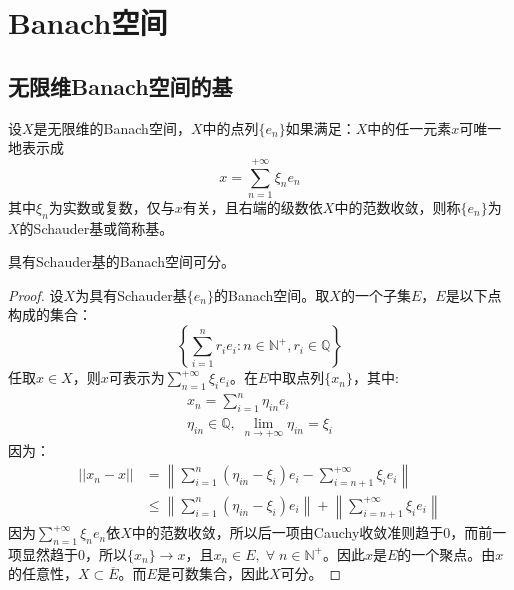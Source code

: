 \section{Banach空间}


\subsection{无限维Banach空间的基}
\begin{definition}
	设$X$是无限维的Banach空间，$X$中的点列$\{e_n\}$如果满足：$X$中的任一元素$x$可唯一地表示成
	\begin{equation*}
		x=\sum_{n=1}^{+\infty}\xi_ne_n
	\end{equation*}
	其中$\xi_n$为实数或复数，仅与$x$有关，且右端的级数依$X$中的范数收敛，则称$\{e_n\}$为$X$的Schauder基或简称基。
\end{definition}
\begin{theorem}
	具有Schauder基的Banach空间可分。
\end{theorem}
\begin{proof}
	设$X$为具有Schauder基$\{e_n\}$的Banach空间。取$X$的一个子集$E$，$E$是以下点构成的集合：
	\begin{equation*}
		\left\{\sum_{i=1}^nr_ie_i:n\in\mathbb{N}^+,r_i\in\mathbb{Q}\right\}
	\end{equation*}
	任取$x\in X$，则$x$可表示为$\sum\limits_{n=1}^{+\infty}\xi_ie_i$。在$E$中取点列$\{x_n\}$，其中:
	\begin{gather*}
		x_n=\sum_{i=1}^{n}\eta_{in}e_i \\
		\eta_{in}\in\mathbb{Q},\;\lim_{n\to+\infty}\eta_{in}=\xi_i
	\end{gather*}
	因为：
	\begin{align*}
		||x_n-x||
		&=\left\|\sum_{i=1}^{n}(\eta_{in}-\xi_i)e_i-\sum_{i=n+1}^{+\infty}\xi_ie_i\right\| \\
		&\leqslant\left\|\sum_{i=1}^{n}(\eta_{in}-\xi_i)e_i\right\|+\left\|\sum_{i=n+1}^{+\infty}\xi_ie_i\right\|
	\end{align*}
	因为$\sum\limits_{n=1}^{+\infty}\xi_ne_n$依$X$中的范数收敛，所以后一项由Cauchy收敛准则趋于$0$，而前一项显然趋于$0$，所以$\{x_n\}\rightarrow x$，且$x_n\in E,\;\forall\;n\in\mathbb{N}^+$。因此$x$是$E$的一个聚点。由$x$的任意性，$X\subset\overline{E}$。而$E$是可数集合，因此$X$可分。
\end{proof}

